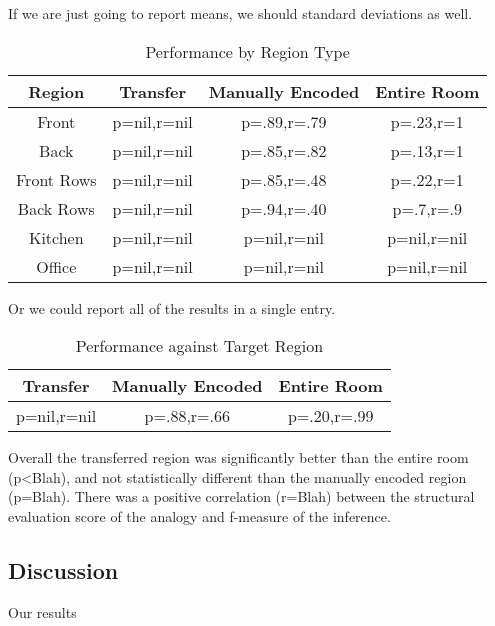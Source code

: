 If we are just going to report means, we should standard deviations as well. %

\begin{table}
\small
\caption{Performance by Region Type}
\begin{tabular}{|c|c|c|c|}
\hline
Region & Transfer & Manually Encoded & Entire Room \\
\hline
Front & p=nil,r=nil & p=.89,r=.79 & p=.23,r=1 \\
Back & p=nil,r=nil & p=.85,r=.82 & p=.13,r=1 \\
Front Rows & p=nil,r=nil & p=.85,r=.48 & p=.22,r=1 \\
Back Rows & p=nil,r=nil & p=.94,r=.40 & p=.7,r=.9 \\
Kitchen & p=nil,r=nil & p=nil,r=nil & p=nil,r=nil \\
Office & p=nil,r=nil & p=nil,r=nil & p=nil,r=nil \\
\hline
\end{tabular}
\end{table}

Or we could report all of the results in a single entry.

\begin{table}
\small
\caption{Performance against Target Region}
\begin{tabular}{|c|c|c|}
\hline
Transfer & Manually Encoded & Entire Room \\
\hline
p=nil,r=nil & p=.88,r=.66 & p=.20,r=.99 \\
\hline
\end{tabular}
\end{table}


Overall the transferred region was significantly better than the entire room (p<Blah), and not statistically different than the manually encoded region (p=Blah). There was a positive correlation (r=Blah) between the structural evaluation score of the analogy and f-measure of the inference.


\subsection{Discussion}

Our results

